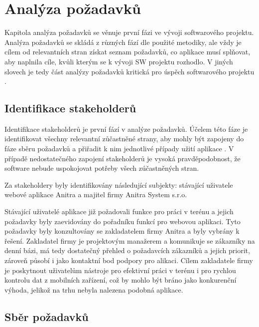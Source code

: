 
\chapter{Analýza požadavků}

Kapitola analýza požadavků se věnuje první fázi ve vývoji softwarového projektu. Analýza požadavků se skládá z různých fází dle použité metodiky, ale vždy je cílem od relevantních stran získat seznam požadavků, co aplikace musí splňovat, aby naplnila cíle, kvůli kterým se k vývoji SW projektu rozhodlo. V jiných slovech je tedy část analýzy požadavků kritická pro úspěch softwarového projektu \cite{maguire2002user}.


\section{Identifikace stakeholderů}


Identifikace stakeholderů je první fází v analýze požadavků. Účelem této fáze je identifikovat všechny relevantní zůčastněné strany, aby mohly být zapojeny do fáze sběru požadavků a přiřadit k nim jednotlivé případy užití aplikace \cite{maguire2002user}. V případě nedostatečného zapojení stakeholderů je vysoká pravděpodobnost, že software nebude uspokojovat potřeby všech zúčastněných stran.

Za stakeholdery byly identifikovány následující subjekty: stávající uživatele webové aplikace Anitra a majitel firmy Anitra System s.r.o.

Stávající uživatelé aplikace již požadovali funkce pro práci v terénu a jejich požadavky byly zaevidovány do pořadníku funkcí pro webovou aplikaci. Tyto požadavky byly konzultovány se zakladatelem firmy Anitra a byly vybrány k řešení. Zakladatel firmy je projektovým manažerem a komunikuje se zákazníky na denní bázi, má tedy dostatečný přehled o požadavcích zákazníků a jejich priorit, zároveň působí i jako kontaktní bod podpory pro alikaci. Cílem zakladatele firmy je poskytnout uživatelům nástroje pro efektivní práci v terénu i pro rychlou kontrolu dat z mobilních zařízení, což by mohlo být bráno jako konkurenční výhoda, jelikož na trhu nebyla nalezena podobná aplikace.

\section{Sběr požadavků}

